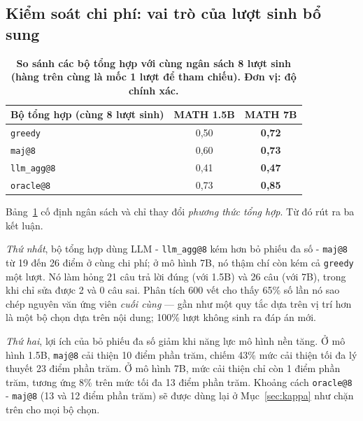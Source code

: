 \documentclass[12pt,a4paper]{article}
\begin{document}
\subsection{Kiểm soát chi phí: vai trò của lượt sinh bổ sung}\label{sec:budget}

\begin{table}[h]\centering\small
\begin{tabular}{@{}l c c@{}}
\toprule
Bộ tổng hợp (cùng 8 lượt sinh) & MATH 1.5B & MATH 7B\\
\midrule
\texttt{greedy} & 0,50 & \textbf{0,72}\\
\texttt{maj@8}     & 0,60 & \textbf{0,73}\\
\texttt{llm\_agg@8} & 0,41 & \textbf{0,47}\\
\texttt{oracle@8}      & 0,73 & \textbf{0,85}\\
\bottomrule
\end{tabular}
\caption{\textbf{So sánh các bộ tổng hợp với cùng ngân sách 8 lượt sinh (hàng trên cùng là mốc 1 lượt để tham chiếu). Đơn vị: độ chính xác.}}
\label{tab:budget}
\end{table}

Bảng~\ref{tab:budget} cố định ngân sách và chỉ thay đổi \textit{phương thức tổng hợp}. Từ đó rút ra ba kết luận.

\textit{Thứ nhất}, bộ tổng hợp dùng LLM - \texttt{llm\_agg@8} kém hơn bỏ phiếu đa số - \texttt{maj@8} từ 19 đến 26 điểm ở cùng chi phí; ở mô hình 7B, nó thậm chí còn kém cả \texttt{greedy} một lượt. Nó làm hỏng 21 câu trả lời đúng (với 1.5B) và 26 câu (với 7B), trong khi chỉ sửa được 2 và 0 câu sai. Phân tích 600 vết cho thấy 65\% số lần nó sao chép nguyên văn ứng viên \textit{cuối cùng} --- gần như một quy tắc dựa trên vị trí hơn là một bộ chọn dựa trên nội dung; 100\% lượt không sinh ra đáp án mới.

\textit{Thứ hai}, lợi ích của bỏ phiếu đa số giảm khi năng lực mô hình nền tăng. Ở mô hình 1.5B, \texttt{maj@8} cải thiện 10 điểm phần trăm, chiếm 43\% mức cải thiện tối đa lý thuyết 23 điểm phần trăm. Ở mô hình 7B, mức cải thiện chỉ còn 1 điểm phần trăm, tương ứng 8\% trên mức tối đa 13 điểm phần trăm. Khoảng cách \texttt{oracle@8} - \texttt{maj@8} (13 và 12 điểm phần trăm) sẽ được dùng lại ở Mục~\ref{sec:kappa} như chặn trên cho mọi bộ chọn.
\end{document}
